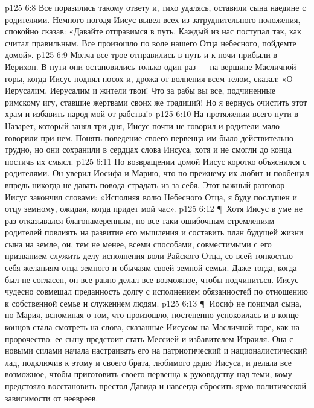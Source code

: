 \vs p125 6:8 Все поразились такому ответу и, тихо удалясь, оставили сына наедине с родителями. Немного погодя Иисус вывел всех из затруднительного положения, спокойно сказав: «Давайте отправимся в путь. Каждый из нас поступал так, как считал правильным. Все произошло по воле нашего Отца небесного, пойдемте домой».
\vs p125 6:9 Молча все трое отправились в путь и к ночи прибыли в Иерихон. В пути они остановились только один раз --- на вершине Масличной горы, когда Иисус поднял посох и, дрожа от волнения всем телом, сказал: «О Иерусалим, Иерусалим и жители твои! Что за рабы вы все, подчиненные римскому игу, ставшие жертвами своих же традиций! Но я вернусь очистить этот храм и избавить народ мой от рабства!»
\vs p125 6:10 На протяжении всего пути в Назарет, который занял три дня, Иисус почти не говорил и родители мало говорили при нем. Понять поведение своего первенца им было действительно трудно, но они сохранили в сердцах слова Иисуса, хотя и не смогли до конца постичь их смысл.
\vs p125 6:11 По возвращении домой Иисус коротко объяснился с родителями. Он уверил Иосифа и Марию, что по\hyp{}прежнему их любит и пообещал впредь никогда не давать повода страдать из\hyp{}за себя. Этот важный разговор Иисус закончил словами: «Исполняя волю Небесного Отца, я буду послушен и отцу земному, ожидая, когда придет мой час».
\vs p125 6:12 \P\ Хотя Иисус в уме не раз отказывался  благонамеренным, но все\hyp{}таки ошибочным стремлениям родителей повлиять на развитие его мышления и составить план будущей жизни сына на земле, он, тем не менее, всеми способами, совместимыми с его призванием служить делу исполнения воли Райского Отца, со всей тонкостью  себя желаниям отца земного и обычаям своей земной семьи. Даже тогда, когда был не согласен, он все равно делал все возможное, чтобы подчиниться. Иисус чудесно совмещал преданность долгу с исполнением обязанностей по отношению к собственной семье и служением людям.
\vs p125 6:13 \P\ Иосиф не понимал сына, но Мария, вспоминая о том, что произошло, постепенно успокоилась и в конце концов стала смотреть на слова, сказанные Иисусом на Масличной горе, как на пророчество: ее сыну предстоит стать Мессией и избавителем Израиля. Она с новыми силами начала настраивать его на патриотический и националистический лад, подключив к этому и своего брата, любимого дядю Иисуса, и делала все возможное, чтобы приготовить своего первенца к руководству над теми, кому предстояло восстановить престол Давида и навсегда сбросить ярмо политической зависимости от неевреев.
